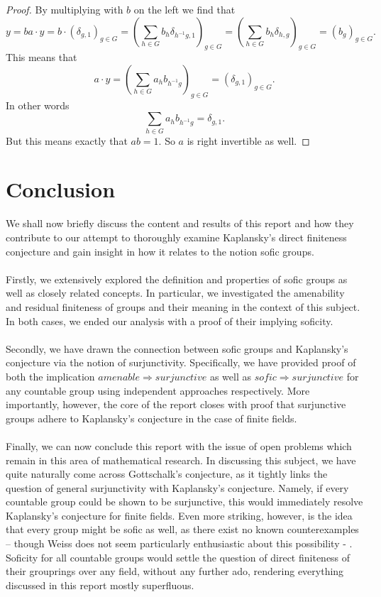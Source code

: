 \documentclass[titlepage, a4paper]{article}
\theoremstyle{theoremdd}
\theoremstyle{definition}
\theoremstyle{remark}
\begin{document}
\begin{proof}
		By multiplying with $b$ on the left we find that \[
			 y = ba\cdot y = b\cdot (\delta_{g, 1})_{g \in G} = \left( \sum_{h \in G} b_{h} \delta_{h^{-1}g, 1} \right)_{g \in G} = \left( \sum_{h \in G} b_{h} \delta_{h, g} \right)_{g \in G}
		 = \left( b_{g} \right) _{g \in G}.\] 
		This means that \[
		a\cdot y = \left( \sum_{h \in G} a_h b_{h^{-1}g} \right)_{g \in G} = \left( \delta_{g, 1} \right) _{g \in G} 
	.\] 
	In other words
	\[
	\sum_{h \in G} a_h b_{h^{-1}g} = \delta_{g, 1}
	.\]
	But this means exactly that $ab = 1$. So  $a$ is right invertible as well. 
	\end{proof}	
	
	\section{Conclusion}

We shall now briefly discuss the content and results of this report and how they contribute to our attempt to thoroughly examine Kaplansky’s direct finiteness conjecture and gain insight in how it relates to the notion sofic groups.\\
\\
Firstly, we extensively explored the definition and properties of sofic groups as well as closely related concepts. In particular, we investigated the amenability and residual finiteness of groups and their meaning in the context of this subject. In both cases, we ended our analysis with a proof of their implying soficity. \\
\\
Secondly, we have drawn the connection between sofic groups and Kaplansky’s conjecture via the notion of surjunctivity. Specifically, we have provided proof of both the implication $amenable \Rightarrow surjunctive$ as well as $sofic \Rightarrow surjunctive$ for any countable group using independent approaches respectively. More importantly, however, the core of the report closes with proof that surjunctive groups adhere to Kaplansky’s conjecture in the case of finite fields. \\
\\
Finally, we can now conclude this report with the issue of open problems which remain in this area of mathematical research. In discussing this subject, we have quite naturally come across Gottschalk’s conjecture, as it tightly links the question of general surjunctivity with Kaplansky’s conjecture. Namely, if every countable group could be shown to be surjunctive, this would immediately resolve Kaplansky’s conjecture for finite fields. Even more striking, however, is the idea that every group might be sofic as well, as there exist no known counterexamples – though Weiss does not seem particularly enthusiastic about this possibility \cite[introduction]{weiss_2000} -  . Soficity for all countable groups would settle the question of direct finiteness of their grouprings over any field, without any further ado, rendering everything discussed in this report mostly superfluous.
\end{document}
